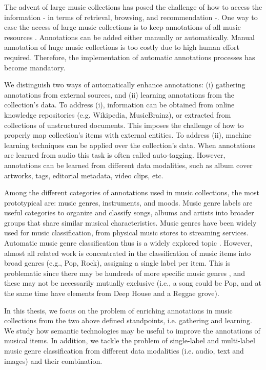 The advent of large music collections has posed the challenge of how to access the information - in terms of retrieval, browsing, and recommendation -. One way to ease the access of large music collections is to keep annotations of all music resources \cite{sordo2012semantic}. Annotations can be added either manually or automatically. Manual annotation of huge music collections is too costly due to high human effort required. Therefore, the implementation of automatic annotations processes has become mandatory. 

We distinguish two ways of automatically enhance annotations: (i) gathering annotations from external sources, and (ii) learning annotations from the collection's data. To address (i), information can be obtained from online knowledge repositories (e.g. Wikipedia, MusicBrainz), or extracted from collections of unstructured documents. This imposes the challenge of how to properly map collection's items with external entities. To address (ii), machine learning techniques can be applied over the collection's data. When annotations are learned from audio this task is often called auto-tagging. However, annotations can be learned from different data modalities, such as album cover artworks, tags, editorial metadata, video clips, etc.

Among the different categories of annotations used in music collections, the most prototypical are: music genres, instruments, and moods. 
Music genre labels are useful categories to organize and classify songs, albums and artists into broader groups that share similar musical characteristics. Music genres have been widely used for music classification, from physical music stores to streaming services. Automatic music genre classification thus is a widely explored topic \citep{sturm2012survey}.
However, almost all related work is concentrated in the classification of music items into broad genres (e.g., Pop, Rock), assigning a single label per item. This is problematic since there may be hundreds of more specific music genres \cite{pachet2000taxonomy}, and these may not be necessarily mutually exclusive (i.e., a song could be Pop, and at the same time have elements from Deep House and a Reggae grove). 

In this thesis, we focus on the problem of enriching annotations in music collections from the two above defined standpoints, i.e. gathering and learning. We study how semantic technologies may be useful to improve the annotations of musical items. In addition, we tackle the problem of single-label and multi-label music genre classification from different data modalities (i.e. audio, text and images) and their combination.


